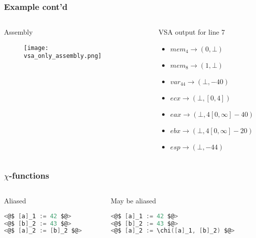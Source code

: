 \documentclass[10pt, xcolor={dvipsnames}]{beamer}
\begin{document}
\begin{frame}
	\frametitle{Example cont'd}
	\begin{columns}[T] %
		\begin{column}{.48\textwidth}
			\begin{block}{Assembly}
			\begin{figure}
				\centering
				\texttt{[image: vsa\_only\_assembly.png]}
			\end{figure}
			\end{block}
		\end{column}%
		\hfill%
		\begin{column}{.48\textwidth}
			\begin{block}{VSA output for line 7}
				\begin{itemize}
					\item $mem_4 \rightarrow (0, \bot)$
					\item $mem_8 \rightarrow (1, \bot)$
					\item $var_{44} \rightarrow (\bot, -40)$
					\item $ecx \rightarrow (\bot, [0, 4])$
					\item $eax \rightarrow (\bot, 4[0, \infty]-40)$
					\item $ebx \rightarrow (\bot, 4[0, \infty]-20)$
					\item $esp \rightarrow (\bot, -44)$
				\end{itemize}
			\end{block}
		\end{column}%
	\end{columns}
\end{frame}

\begin{frame}[fragile]
	\frametitle{$\chi$-functions}
	\begin{columns}[T] %
		\begin{column}{.48\textwidth}
			\begin{block}{Aliased}
			\begin{lstlisting}[language=C]
<@$ [a]_1 := 42 $@>
<@$ [b]_2 := 43 $@>
<@$ [a]_2 := [b]_2 $@>
			\end{lstlisting}
			\end{block}
		\end{column}%
		\hfill%
		\begin{column}{.48\textwidth}
			\begin{block}{May be aliased}
			\begin{lstlisting}[language=C]
<@$ [a]_1 := 42 $@>
<@$ [b]_2 := 43 $@>
<@$ [a]_2 := \chi([a]_1, [b]_2) $@>
			\end{lstlisting}
			\end{block}
		\end{column}%
	\end{columns}
\end{frame}
\end{document}

